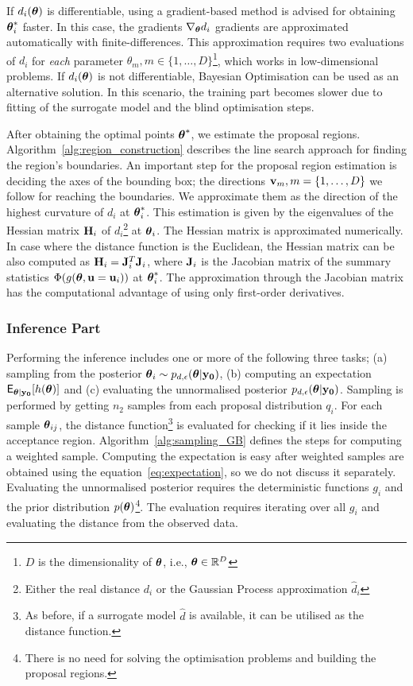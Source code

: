If \(d_i(\boldsymbol{\theta})\) is differentiable, using a gradient-based method
is advised for obtaining \(\boldsymbol{\theta}_i^*\) faster. In this case, the
gradients \(\nabla_{\boldsymbol{\theta}} d_i\) gradients are approximated
automatically with finite-differences. This approximation requires two
evaluations of \(d_i\) for \emph{each} parameter
\(\theta_m, m \in \{1, \ldots, D\}\)\footnote{\(D\) is the
  dimensionality of \(\boldsymbol{\theta}\), i.e.,  \(\boldsymbol{\theta} \in \mathbb{R}^D\)},
which works in low-dimensional problems. If \(d_i(\boldsymbol{\theta})\) is not
differentiable, Bayesian Optimisation can be used as an alternative
solution. In this scenario, the training part becomes slower due to
fitting of the surrogate model and the blind optimisation steps.

After obtaining the optimal points \(\boldsymbol{\theta}^*\), we estimate the
proposal regions. Algorithm~\ref{alg:region_construction} describes
the line search approach for finding the region's boundaries. An
important step for the proposal region estimation is deciding the axes
of the bounding box; the directions \(\mathbf{v}_m, m = \{1, \ldots, D\}\) we
follow for reaching the boundaries. We approximate them as the
direction of the highest curvature of \(d_i\) at \(\boldsymbol{\theta}_i^*\). This
estimation is given by the eigenvalues of the Hessian matrix
\(\mathbf{H}_i\) of \(d_i\)\footnote{Either the real distance \(d_i\) or
  the Gaussian Process approximation \(\hat{d}_i\)} at
\(\boldsymbol{\theta}_i\). The Hessian matrix is approximated numerically. In case
where the distance function is the Euclidean, the Hessian matrix can
be also computed as \(\mathbf{H}_i = \mathbf{J}_i^T\mathbf{J}_i\), where \(\mathbf{J}_i\)
is the Jacobian matrix of the summary statistics
\(\Phi(g(\boldsymbol{\theta}, \mathbf{u}=\mathbf{u}_i))\) at \(\boldsymbol{\theta}_i^*\). The approximation
through the Jacobian matrix has the computational advantage of using
only first-order derivatives.

\subsubsection*{Inference Part}
Performing the inference includes one or more of the following three
tasks; (a) sampling from the posterior
\( \boldsymbol{\theta}_i \sim p_{d, \epsilon}(\boldsymbol{\theta}|\mathbf{y_0})\), (b) computing an
expectation \(\mathsf{E}_{\boldsymbol{\theta}|\mathbf{y_0}}[h(\boldsymbol{\theta})]\) and (c) evaluating the
unnormalised posterior \(p_{d, \epsilon}(\boldsymbol{\theta}|\mathbf{y_0})\). Sampling is
performed by getting \(n_2\) samples from each proposal distribution
\(q_i\). For each sample \(\boldsymbol{\theta}_{ij}\), the distance
function\footnote{As before, if a surrogate model \(\hat{d}\) is
  available, it can be utilised as the distance function.} is
evaluated for checking if it lies inside the acceptance
region. Algorithm~\ref{alg:sampling_GB} defines the steps for
computing a weighted sample. Computing the expectation is easy after
weighted samples are obtained using the equation~\ref{eq:expectation},
so we do not discuss it separately. Evaluating the unnormalised
posterior requires the deterministic functions \(g_i\) and the prior
distribution \(p(\boldsymbol{\theta})\)\footnote{There is no need for solving the
  optimisation problems and building the proposal regions.}. The
evaluation requires iterating over all \(g_i\) and evaluating the
distance from the observed data.

